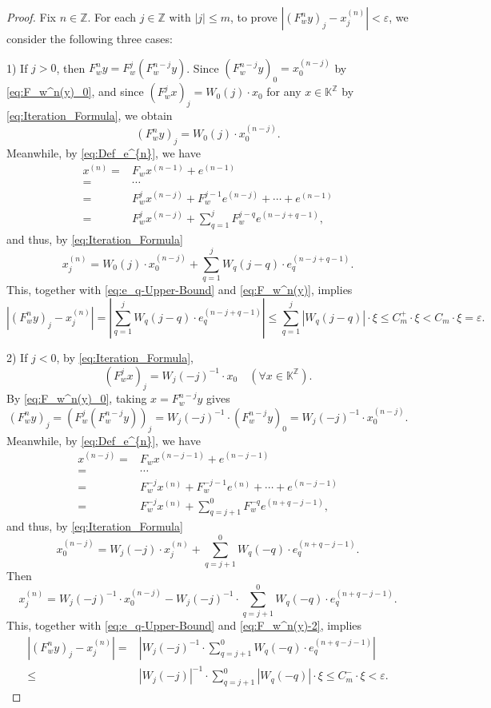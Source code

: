 \documentclass[11pt]{amsart}
\theoremstyle{definition}
\theoremstyle{remark}
\theoremstyle{plain}
\begin{document}
\begin{proof}
Fix \(n\in\mathbb{Z}\). For each $j\in \mathbb{Z}$ with \(|j|\le m\), to prove
$|(F_w^n y)_j-x^{(n)}_j|<\varepsilon$, we consider the following
three cases:

1)
If \(j>0\), then \(F_w^n y = F_w^j(F_w^{n-j}y)\).
Since \((F_w^{n-j}y)_0 = x^{(n-j)}_0\) by \eqref{eq:F_w^n(y)_0},
and since \((F_w^j x)_j = W_0(j)\cdot x_0\) for any
\(x\in \mathbb{K}^{\mathbb{Z}}\) by \eqref{eq:Iteration_Formula},
we obtain
\begin{equation}\label{eq:F_w^n(y)}
(F_w^n y)_j=W_0(j)\cdot x^{(n-j)}_0.
\end{equation}
Meanwhile, by \eqref{eq:Def_e^{n}}, we have
\begin{align*}
x^{(n)}=& F_{w}x^{(n-1)}+e^{(n-1)}\\
=&
\cdots \\
=& F_{w}^{j}x^{(n-j)}+
F_{w}^{j-1}e^{(n-j)}+\cdots +e^{(n-1)}\\
=& F_{w}^{j}x^{(n-j)}
+\sum_{q=1}^{j}F_{w}^{j-q}e^{(n-j+q-1)},
\end{align*}
and thus, by \eqref{eq:Iteration_Formula}
\[
x^{(n)}_j
=
W_0(j)\cdot x^{(n-j)}_0
+
\sum_{q=1}^{j} W_q(j-q)\cdot e_q^{(n-j+q-1)}.
\]
This, together with \eqref{eq:e_q-Upper-Bound} and \eqref{eq:F_w^n(y)},
implies
\[
\left|(F_w^n y)_j-x^{(n)}_j\right|
=\left|\sum_{q=1}^{j} W_q(j-q)\cdot e_q^{(n-j+q-1)}\right|
\leq \sum_{q=1}^{j}|W_q(j-q)|\cdot \xi
\leq C_{m}^{+}\cdot \xi
< C_{m}\cdot \xi=\varepsilon .
\]

2)
If \(j<0\), by \eqref{eq:Iteration_Formula},
\[
(F_w^{j}x)_j = W_j(-j)^{-1}\cdot x_0
\quad (\forall x\in\mathbb{K}^{\mathbb{Z}}).
\]
By \eqref{eq:F_w^n(y)_0}, taking \(x = F_w^{n-j} y\) gives
\begin{equation}\label{eq:F_w^n(y)-2}
(F_w^{n}y)_j = (F_w^{j}(F_w^{n-j} y))_j = W_j(-j)^{-1}\cdot(F_w^{n-j} y)_0
=W_j(-j)^{-1}\cdot x^{(n-j)}_0.
\end{equation}
Meanwhile, by \eqref{eq:Def_e^{n}}, we have
\begin{align*}
x^{(n-j)}=& F_{w}x^{(n-j-1)}+e^{(n-j-1)}\\
=&
\cdots \\
=& F_{w}^{-j}x^{(n)}+
F_{w}^{-j-1}e^{(n)}+\cdots +e^{(n-j-1)}\\
=& F_{w}^{-j}x^{(n)}
+\sum_{q=j+1}^{0}F_{w}^{-q}e^{(n+q-j-1)},
\end{align*}
and thus, by \eqref{eq:Iteration_Formula}
\[
x^{(n-j)}_0
=
W_j(-j)\cdot x^{(n)}_j
+
\sum_{q=j+1}^{0}W_q(-q)\cdot e_q^{(n+q-j-1)}.
\]
Then
\[
x^{(n)}_j=W_j(-j)^{-1}\cdot x^{(n-j)}_0
-
W_j(-j)^{-1}\cdot \sum_{q=j+1}^{0}W_q(-q)\cdot
e_q^{(n+q-j-1)}.
\]
This, together with \eqref{eq:e_q-Upper-Bound} and \eqref{eq:F_w^n(y)-2},
implies
\begin{align*}
|(F_w^n y)_j-x^{(n)}_j|
=& \left|W_j(-j)^{-1}\cdot \sum_{q=j+1}^{0}W_q(-q)\cdot
e_q^{(n+q-j-1)}\right|\\
\le &
|W_j(-j)|^{-1}\cdot \sum_{q=j+1}^{0}|W_q(-q)|\cdot \xi
\leq C_{m}^{-}\cdot \xi <\varepsilon .
\end{align*}


\end{proof}
\end{document}
